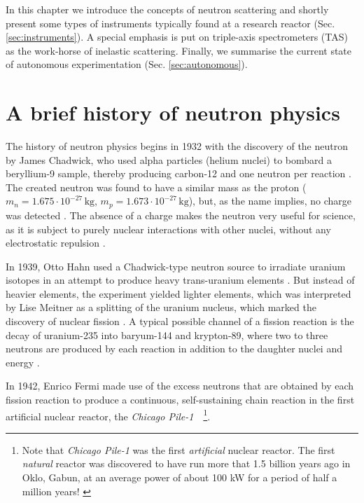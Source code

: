 In this chapter we introduce the concepts of neutron scattering and shortly present some types of instruments typically found at a research reactor (Sec. \ref{sec:instruments}). A special emphasis is put on triple-axis spectrometers (TAS) as the work-horse of inelastic scattering. Finally, we summarise the current state of autonomous experimentation (Sec. \ref{sec:autonomous}).



\section{A brief history of neutron physics \label{sec:neutrons}}

The history of neutron physics begins in 1932 with the discovery of the neutron by James Chadwick, who used alpha particles (helium nuclei) to bombard a beryllium-9 sample, thereby producing carbon-12 and one neutron per reaction \cite[p. 1]{Jacrot2021}. The created neutron was found to have a similar mass as the proton ($m_n = 1.675\cdot10^{-27}\,\mathrm{kg}$, $m_p = 1.673\cdot10^{-27}\,\mathrm{kg}$), but, as the name implies, no charge was detected \cite[p. 2]{Squires2012}. The absence of a charge makes the neutron very useful for science, as it is subject to purely nuclear interactions with other nuclei, without any electrostatic repulsion \cite[p. 1]{Squires2012}.

In 1939, Otto Hahn used a Chadwick-type neutron source to irradiate uranium isotopes in an attempt to produce heavy trans-uranium elements \cite{wiki_fission}. But instead of heavier elements, the experiment yielded lighter elements, which was interpreted by Lise Meitner as a splitting of the uranium nucleus, which marked the discovery of nuclear fission \cite{wiki_fission}. A typical possible channel of a fission reaction is the decay of uranium-235 into baryum-144 and krypton-89, where two to three neutrons are produced by each reaction in addition to the daughter nuclei and energy \cite{wiki_fission}.

In 1942, Enrico Fermi made use of the excess neutrons that are obtained by each fission reaction to produce a continuous, self-sustaining chain reaction in the first artificial nuclear reactor, the \textit{Chicago Pile-1}~\cite[p.1]{Jacrot2021}~\footnote{Note that \textit{Chicago Pile-1} was the first \textit{artificial} nuclear reactor. The first \textit{natural} reactor was discovered to have run more that 1.5 billion years ago in Oklo, Gabun, at an average power of about 100 kW for a period of half a million years! \cite{wiki_oklo}}.

